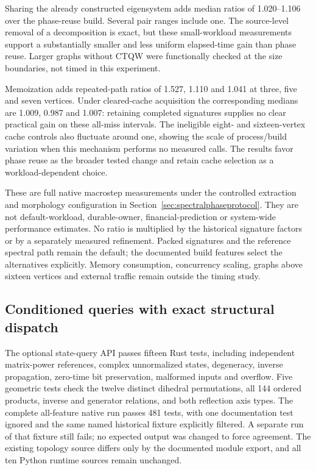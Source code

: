 \documentclass[11pt,a4paper]{article}
\theoremstyle{definition}\newtheorem{definition}[theorem]{Definition}
\begin{document}
Sharing the already constructed eigensystem adds median ratios of 1.020--1.106 over the phase-reuse build. Several pair ranges include one. The source-level removal of a decomposition is exact, but these small-workload measurements support a substantially smaller and less uniform elapsed-time gain than phase reuse. Larger graphs without CTQW were functionally checked at the size boundaries, not timed in this experiment.

Memoization adds repeated-path ratios of 1.527, 1.110 and 1.041 at three, five and seven vertices. Under cleared-cache acquisition the corresponding medians are 1.009, 0.987 and 1.007: retaining completed signatures supplies no clear practical gain on these all-miss intervals. The ineligible eight- and sixteen-vertex cache controls also fluctuate around one, showing the scale of process/build variation when this mechanism performs no measured calls. The results favor phase reuse as the broader tested change and retain cache selection as a workload-dependent choice.

These are full native macrostep measurements under the controlled extraction and morphology configuration in Section~\ref{sec:spectralphaseprotocol}. They are not default-workload, durable-owner, financial-prediction or system-wide performance estimates. No ratio is multiplied by the historical signature factors or by a separately measured refinement. Packed signatures and the reference spectral path remain the default; the documented build features select the alternatives explicitly. Memory consumption, concurrency scaling, graphs above sixteen vertices and external traffic remain outside the timing study.

\subsection{Conditioned queries with exact structural dispatch}\label{sec:conditionedresults}
The optional state-query API passes fifteen Rust tests, including independent
matrix-power references, complex unnormalized states, degeneracy, inverse
propagation, zero-time bit preservation, malformed inputs and overflow. Five
geometric tests check the twelve distinct dihedral permutations,
all 144 ordered products, inverse and generator relations, and both reflection
axis types. The complete all-feature native run passes 481 tests, with one
documentation test ignored and the same named historical fixture explicitly
filtered. A separate run of that fixture still fails; no expected output was
changed to force agreement. The existing topology source differs only by the
documented module export, and all ten Python runtime sources remain unchanged.
\end{document}
